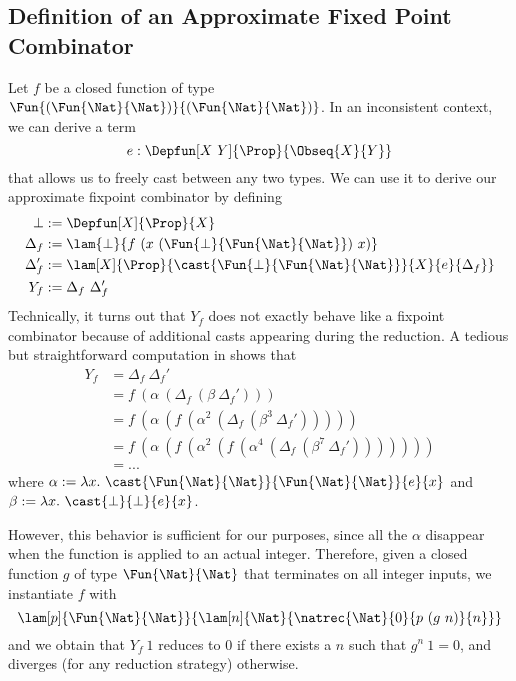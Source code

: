   \subsection{Definition of an Approximate Fixed Point Combinator}
  
  Let \( f \) be a closed function of type \( \Fun{(\Fun{\Nat}{\Nat})}{(\Fun{\Nat}{\Nat})} \).
  In an inconsistent context, we can derive a term
  \[
     e : \Depfun[X\ Y]{\Prop}{\Obseq{X}{Y}}
  \]
  that allows us to freely cast between any two types.
  We can use it to derive our approximate fixpoint combinator by defining
  \begin{align*}
    \bot &:= \Depfun[X]{\Prop}{X}\\
    \Delta_f &:= \lam{\bot}{f\ (x\ (\Fun{\bot}{\Fun{\Nat}{\Nat}})\ x)}\\
    \Delta_f' &:= \lam[X]{\Prop}{\cast{\Fun{\bot}{\Fun{\Nat}{\Nat}}}{X}{e}{\Delta_f}}\\
    Y_f &:= \Delta_f\ \Delta_f'
  \end{align*}
  Technically, it turns out that \( Y_f \) does not exactly behave like
  a fixpoint combinator because of additional casts appearing during the
  reduction.
  A tedious but straightforward computation in \SetoidCC shows that
  \begin{align*}
    Y_f &= \Delta_f\ \Delta_f'\\
        &= f\ (\alpha\ (\Delta_f\ (\beta\ \Delta_f')))\\
        &= f\ (\alpha\ (f\ (\alpha^2\ (\Delta_f\ (\beta^3\ \Delta_f')))))\\
        &= f\ (\alpha\ (f\ (\alpha^2\ (f\ (\alpha^4\ (\Delta_f\ (\beta^7\ \Delta_f')))))))\\
        &= ...
  \end{align*}
  where \( \alpha := \lambda x.\ {\cast{\Fun{\Nat}{\Nat}}{\Fun{\Nat}{\Nat}}{e}{x}} \)
  and \( \beta := \lambda x.\ {\cast{\bot}{\bot}{e}{x}} \).
  
  However, this behavior is sufficient for our purposes, since all the \( \alpha \) disappear
  when the function is applied to an actual integer.
  Therefore, given a closed function \( g \) of type \( \Fun{\Nat}{\Nat} \) that
  terminates on all integer inputs, we instantiate \( f \) with
  \[
    \lam[p]{\Fun{\Nat}{\Nat}}{\lam[n]{\Nat}{{\natrec{\Nat}{0}{p\ (g\ n)}{n}}}}
  \]
  and we obtain that \( Y_f\ 1 \) reduces to 0 if there exists a \( n \) such that
  \( g^n\ 1 = 0 \), and diverges (for any reduction strategy) otherwise.
  
